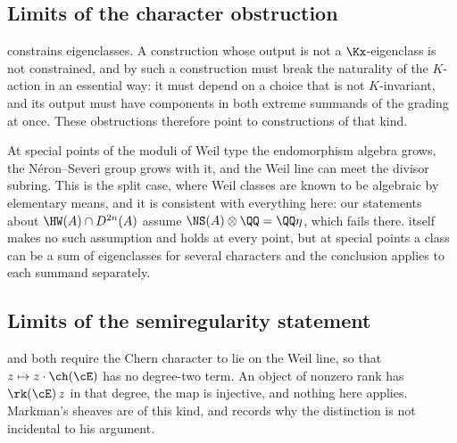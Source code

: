 \subsection{Limits of the character obstruction}

\begin{remark}\label{rem:nonequivariant}
\cite[Theorem~5.6]{paperI} constrains eigenclasses. A construction whose output is
not a $\Kx$-eigenclass is not constrained, and by \cite[Remark~5.8]{paperI}
such a construction must break the naturality of the $K$-action in an
essential way: it must depend on a choice that is not $K$-invariant, and its
output must have components in both extreme summands of the grading at once.
These obstructions therefore point to constructions of that kind.
\end{remark}

\begin{remark}\label{rem:special}
At special points of the moduli of Weil type the endomorphism algebra grows,
the N\'eron--Severi group grows with it, and the Weil line can meet the divisor
subring. This is the split case, where Weil classes are known to be algebraic
by elementary means, and it is consistent with everything here: our statements
about $\HW(A)\cap D^{2n}(A)$ assume $\NS(A)\otimes\QQ=\QQ\eta$, which fails
there. \cite[Theorem~5.6]{paperI} itself makes no such assumption and holds at every
point, but at special points a class can be a sum of eigenclasses for several
characters and the conclusion applies to each summand separately.
\end{remark}

\subsection{Limits of the semiregularity statement}

\begin{remark}\label{rem:positiverankscope}
\cite[Theorem~9.7]{paperI} and \cite[Corollary~9.18]{paperI} both require the Chern character to
lie on the Weil line, so that $z\mapsto z\cdot\ch(\cE)$ has no degree-two
term. An object of nonzero rank has $\rk(\cE)\,z$ in that degree, the map is
injective, and nothing here applies. Markman's sheaves are of this kind, and
\cite[Remark~9.9]{paperI} records why the distinction is not incidental to his
argument.
\end{remark}

